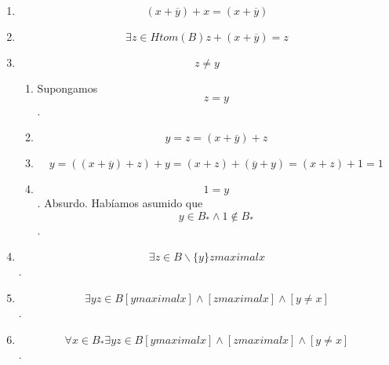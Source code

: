 \begin{enumerate}
\begin{enumerate}
\begin{enumerate}
\begin{enumerate}
\begin{enumerate}
          \begin{enumerate}
          \def\labelenumvi{\arabic{enumvi}.}
          \tightlist
          \item
            \[{y \cdot \overline{y}} = 0\]
          \item
            \[{{x + {({y \cdot \overline{y}})}} = {x + 0}} = x\]
          \item
            \[{{x = {{({x + y})} \cdot {({x + \overline{y}})}}} = {{({x + y})} \cdot 1}} = y\]
          \item
            \[x = y\]. Absurdo. Habíamos asumido que
            \[{y \in \mathit{Htom}}{{{(B)} \land x} \notin \mathit{Htom}}{(B)}\].
          \end{enumerate}
        \end{enumerate}
      \item
        \[{{({x + \overline{y}})} + x} = {({x + \overline{y}})}\]
      \item
        \[\exists{z \in \mathit{Htom}}{(B)}{{z + {({x + \overline{y}})}} = z}\]
      \item
        \[z \neq y\]

        \begin{enumerate}
        \def\labelenumv{\arabic{enumv}.}
        \tightlist
        \item
          Supongamos \[z = y\].
        \item
          \[{y = z} = {{({x + \overline{y}})} + z}\]
        \item
          \[{{{y = {{({{({x + \overline{y}})} + z})} + y}} = {{({x + z})} + {({\overline{y} + y})}}} = {{({x + z})} + 1}} = 1\]
        \item
          \[1 = y\]. Absurdo. Habíamos asumido que
          \[{y \in {B_{\ast} \land 1}} \notin B_{\ast}\].
        \end{enumerate}
      \item
        \[\exists{z \in {B \smallsetminus {\{ y\}}}}z\mathsf{\mathit{maximal}}x\].
      \item
        \[\exists{\mathit{yz} \in B}{{\left\lbrack {y\mathsf{\mathit{maximal}}x} \right\rbrack \land \left\lbrack {z\mathsf{\mathit{maximal}}x} \right\rbrack} \land \left\lbrack {y \neq x} \right\rbrack}\].
      \item
        \[\forall{x \in B_{\ast}}\exists{\mathit{yz} \in B}{{\left\lbrack {y\mathsf{\mathit{maximal}}x} \right\rbrack \land \left\lbrack {z\mathsf{\mathit{maximal}}x} \right\rbrack} \land \left\lbrack {y \neq x} \right\rbrack}\].
      \end{enumerate}
    \end{enumerate}


\end{enumerate}
\end{enumerate}

